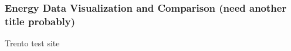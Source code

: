 \subsubsection{Energy Data Visualization and Comparison (need another title probably)}

Trento test site
%